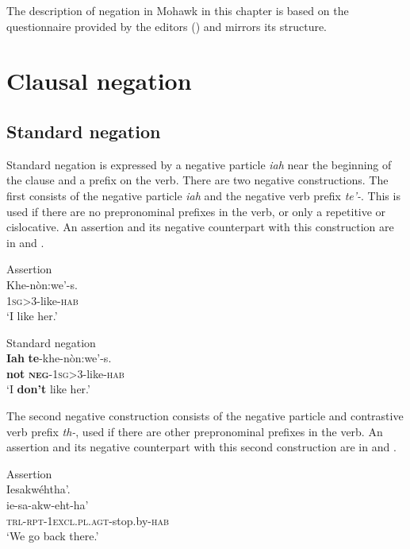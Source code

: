 \documentclass[output=paper,colorlinks,citecolor=brown]{langscibook}
\begin{document}
The description of negation in Mohawk in this chapter is based on the questionnaire provided by the editors () and mirrors its structure.

\section{Clausal negation}\label{sec:moh:2}

\subsection{Standard negation}\label{sec:moh:2.1}

Standard negation is expressed by a negative particle \textit{iah} near the beginning of the clause and a prefix on the verb. There are two negative constructions. The first consists of the negative particle \textit{iah} and the negative verb prefix \textit{te’-}. This is used if there are no prepronominal prefixes in the verb, or only a repetitive or cislocative. An assertion and its negative counterpart with this construction are in  and .

\ea\label{ex:moh:13} Assertion\\
    \gll Khe-nòn:we’-s. \\
         \textsc{1sg>3}-like-\textsc{hab} \\
    \glt ‘I like her.’ 
\z

\ea\label{ex:moh:14} Standard negation\\
    \gll \textbf{Iah} \textbf{te}-khe-nòn:we’-s.\\
         \textbf{not} \textbf{\textsc{neg}}\textsc{-1sg>3}-like-\textsc{hab}\\
    \glt ‘I \textbf{don’t} like her.’
\z

The second negative construction consists of the negative particle and contrastive verb prefix \textit{th-}, used if there are other prepronominal prefixes in the verb. An assertion and its negative counterpart with this second construction are in  and .

\ea\label{ex:moh:15} Assertion\\
    \glll Iesakwéhtha’. \\
         ie-sa-akw-eht-ha’ \\
         \textsc{trl-rpt-1excl.pl.agt}-stop.by-\textsc{hab} \\
    \glt ‘We go back there.’
\z
\end{document}
